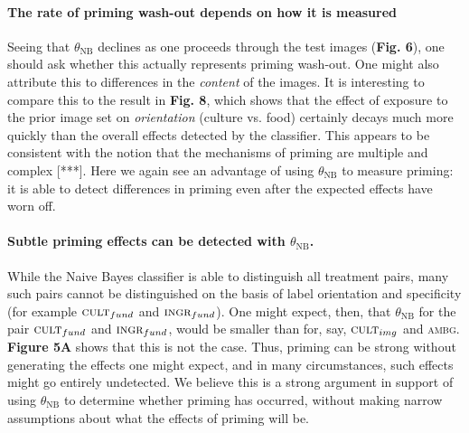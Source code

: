 \documentclass[a4paper]{report}
\begin{document}
\paragraph{The rate of priming wash-out depends on how it is measured}
Seeing that $\theta_\text{NB}$ declines as one proceeds through the test 
images (\textbf{Fig. 6}), one should ask whether this actually represents 
priming wash-out.  One might also attribute this to 
differences in the \textit{content} of the images. It is interesting to 
compare this to the result in \textbf{Fig. 8}, which
shows that the effect of exposure to the prior image set on 
\textit{orientation} (culture vs. food) certainly
decays much more quickly than the overall effects detected by
the classifier.  This appears to be consistent with the notion that the 
mechanisms of priming are multiple and complex [***].  Here we again see an
advantage of using $\theta_\text{NB}$ to measure priming: it is able to detect 
differences in priming even after the expected effects have worn off.

\paragraph{Subtle priming effects can be detected with $\theta_\text{NB}$.}
While the Naive Bayes classifier is able to distinguish all treatment pairs,
many such pairs cannot be distinguished on the basis of label orientation and 
specificity 
(for example $\textsc{cult}_{fund}$ and $\textsc{ingr}_{fund}$).
One might expect, then, that $\theta_\text{NB}$
for the pair $\textsc{cult}_{fund}$ and $\textsc{ingr}_{fund}$, would be 
smaller than for, say, $\textsc{cult}_{img}$ and \textsc{ambg}.  
\textbf{Figure 5A} shows that this is not the case.  Thus, priming can be 
strong without generating the effects one might expect, and in many 
circumstances, such effects might go entirely undetected.  We believe this 
is a strong argument in support of using $\theta_\text{NB}$ to determine 
whether priming has occurred, without making narrow assumptions about what the 
effects of priming will be.
\end{document}
